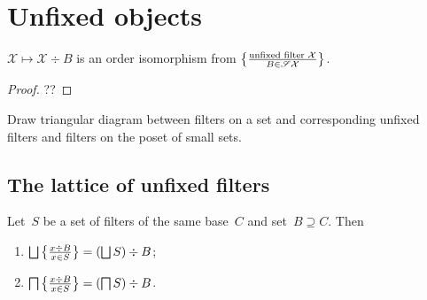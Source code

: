 \chapter{Unfixed objects}

\begin{prop}
$\mathcal{X}\mapsto\mathcal{X}\div B$ is an order
isomorphism from $\left\{ \frac{\text{unfixed filter }\mathcal{X}}{B\in\mathscr{S}\mathcal{X}}\right\}$.
\end{prop}

\begin{proof}
??
\end{proof}

Draw triangular diagram between filters on a set and
corresponding unfixed filters and filters on the poset
of small sets.

\begin{figure}[ht]
\caption{\label{unfix-dia}}


\end{figure}


\section{The lattice of unfixed filters}

\begin{prop}
Let~$S$ be a set of filters of the same base~$C$ and
set~$B\supseteq C$. Then
\begin{enumerate}
\item\label{cup-filteq}
$\bigsqcup\setcond{x\div B}{x\in S} =
  \left(\bigsqcup S\right)\div B$;
\item\label{cap-filteq}
$\bigsqcap\left\{ \frac{x\div B}{x\in S}\right\} =
  \left(\bigsqcap S\right)\div B$.
\end{enumerate}
\end{prop}

